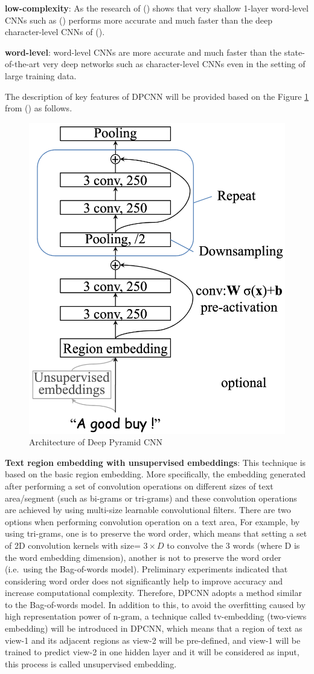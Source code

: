 \documentclass[]{krantz}
\begin{document}
\textbf{low-complexity}: As the research of (\citet{Johnson2016ConvolutionalNN}) shows that very shallow 1-layer word-level CNNs such as (\citet{Kim2014ConvolutionalNN}) performs more accurate and much faster than the deep character-level CNNs of (\citet{Schwenk2017VeryDC}).

\textbf{word-level}: word-level CNNs are more accurate and much faster than the state-of-the-art very deep networks such as character-level CNNs even in the setting of large training data.

The description of key features of DPCNN will be provided based on the Figure \ref{fig:figs-11} from (\citet{Johnson2017DeepPC}) as follows.

\begin{figure}[ht]

{\centering \includegraphics[width=0.35\linewidth]{figures/01-03-cnns-and-their-applications-in-nlp/DPCNN} 

}

\caption{\label{fig:fig_11} Architecture of Deep Pyramid CNN}\label{fig:figs-11}
\end{figure}

\textbf{Text region embedding with unsupervised embeddings}: This technique is based on the basic region embedding. More specifically, the embedding generated after performing a set of convolution operations on different sizes of text area/segment (such as bi-grams or tri-grams) and these convolution operations are achieved by using multi-size learnable convolutional filters. There are two options when performing convolution operation on a text area, For example, by using tri-grams, one is to preserve the word order, which means that setting a set of 2D convolution kernels with size= \(3 \times D\) to convolve the 3 words (where D is the word embedding dimension), another is not to preserve the word order (i.e.~using the Bag-of-words model). Preliminary experiments indicated that considering word order does not significantly help to improve accuracy and increase computational complexity. Therefore, DPCNN adopts a method similar to the Bag-of-words model. In addition to this, to avoid the overfitting caused by high representation power of n-gram, a technique called tv-embedding (two-views embedding) will be introduced in DPCNN, which means that a region of text as view-1 and its adjacent regions as view-2 will be pre-defined, and view-1 will be trained to predict view-2 in one hidden layer and it will be considered as input, this process is called unsupervised embedding.
\end{document}

